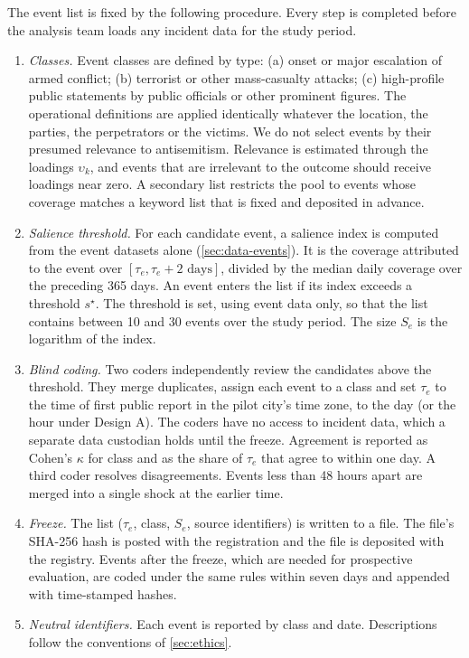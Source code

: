 The event list is fixed by the following procedure. Every step is completed
before the analysis team loads any incident data for the study period.
\begin{enumerate}[1.]
  \item \emph{Classes.} Event classes are defined by type: (a) onset or
  major escalation of armed conflict; (b) terrorist or other mass-casualty
  attacks; (c) high-profile public statements by public officials or other
  prominent figures. The operational definitions are applied identically
  whatever the location, the parties, the perpetrators or the victims. We do
  not select events by their presumed relevance to antisemitism. Relevance
  is estimated through the loadings $\upsilon_k$, and events that are
  irrelevant to the outcome should receive loadings near zero. A secondary
  list restricts the pool to events whose coverage matches a keyword list
  that is fixed and deposited in advance.
  \item \emph{Salience threshold.} For each candidate event, a salience
  index is computed from the event datasets alone
  (\cref{sec:data-events}). It is the coverage attributed to the event over
  $[\tau_e,\tau_e+2\text{ days}]$, divided by the median daily coverage over
  the preceding 365 days. An event enters the list if its index exceeds a
  threshold $s^\star$. The threshold is set, using event data only, so that
  the list contains between 10 and 30 events over the study period. The
  size $S_e$ is the logarithm of the index.
  \item \emph{Blind coding.} Two coders independently review the candidates
  above the threshold. They merge duplicates, assign each event to a class
  and set $\tau_e$ to the time of first public report in the pilot city's
  time zone, to the day (or the hour under Design A). The coders have no
  access to incident data, which a separate data custodian holds until the
  freeze. Agreement is reported as Cohen's $\kappa$ for class and as the
  share of $\tau_e$ that agree to within one day. A third coder resolves
  disagreements. Events less than 48 hours apart are merged into a single
  shock at the earlier time.
  \item \emph{Freeze.} The list ($\tau_e$, class, $S_e$, source identifiers)
  is written to a file. The file's SHA-256 hash is posted with the
  registration and the file is deposited with the registry. Events after the
  freeze, which are needed for prospective evaluation, are coded under the
  same rules within seven days and appended with time-stamped hashes.
  \item \emph{Neutral identifiers.} Each event is reported by class and
  date. Descriptions follow the conventions of \cref{sec:ethics}.
\end{enumerate}

